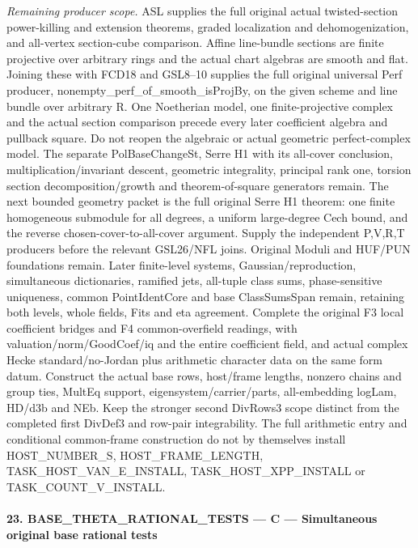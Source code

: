 \documentclass[11pt,a4paper]{article}
\numberwithin{equation}{section}
\theoremstyle{remark}\newtheorem{remark}[theorem]{Remark}
\begin{document}
\emph{Remaining producer scope.} ASL supplies the full original actual twisted-section power-killing and extension theorems, graded localization and dehomogenization, and all-vertex section-cube comparison. Affine line-bundle sections are finite projective over arbitrary rings and the actual chart algebras are smooth and flat. Joining these with FCD18 and GSL8–10 supplies the full original universal Perf producer, nonempty\_\allowbreak perf\_\allowbreak of\_\allowbreak smooth\_\allowbreak isProjBy, on the given scheme and line bundle over arbitrary R. One Noetherian model, one finite-projective complex and the actual section comparison precede every later coefficient algebra and pullback square. Do not reopen the algebraic or actual geometric perfect-complex model. The separate PolBaseChangeSt, Serre H1 with its all-cover conclusion, multiplication/invariant descent, geometric integrality, principal rank one, torsion section decomposition/growth and theorem-of-square generators remain. The next bounded geometry packet is the full original Serre H1 theorem: one finite homogeneous submodule for all degrees, a uniform large-degree Cech bound, and the reverse chosen-cover-to-all-cover argument. Supply the independent P,V,R,T producers before the relevant GSL26/NFL joins. Original Moduli and HUF/PUN foundations remain. Later finite-level systems, Gaussian/reproduction, simultaneous dictionaries, ramified jets, all-tuple class sums, phase-sensitive uniqueness, common PointIdentCore and base ClassSumsSpan remain, retaining both levels, whole fields, Fits and eta agreement. Complete the original F3 local coefficient bridges and F4 common-overfield readings, with valuation/norm/GoodCoef/iq and the entire coefficient field, and actual complex Hecke standard/no-Jordan plus arithmetic character data on the same form datum. Construct the actual base rows, host/frame lengths, nonzero chains and group ties, MultEq support, eigensystem/carrier/parts, all-embedding logLam, HD/d3b and NEb. Keep the stronger second DivRows3 scope distinct from the completed first DivDef3 and row-pair integrability. The full arithmetic entry and conditional common-frame construction do not by themselves install HOST\_\allowbreak NUMBER\_\allowbreak S, HOST\_\allowbreak FRAME\_\allowbreak LENGTH, TASK\_\allowbreak HOST\_\allowbreak VAN\_\allowbreak E\_\allowbreak INSTALL, TASK\_\allowbreak HOST\_\allowbreak XPP\_\allowbreak INSTALL or TASK\_\allowbreak COUNT\_\allowbreak V\_\allowbreak INSTALL.



\paragraph{23. BASE\_\allowbreak THETA\_\allowbreak RATIONAL\_\allowbreak TESTS — C — Simultaneous original base rational tests}
\end{document}

